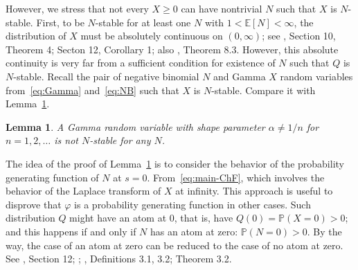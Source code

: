\documentclass[12pt]{amsart}
\newtheorem{lemma}{Lemma}[section]
\theoremstyle{remark}
\theoremstyle{definition}
\begin{document}
However, we stress that not every $X \ge 0$ can have nontrivial $N$ such that $X$ is $N$-stable. First, to be $N$-stable for at least one $N$ with $1 < \mathbb E[N] < \infty$, the distribution of $X$ must be absolutely continuous  on $(0, \infty)$; see \cite[Chapter I]{AthreyaBook}, Section 10, Theorem 4; Secton 12, Corollary 1; also \cite[Chapter 1]{Harris}, Theorem 8.3. However, this absolute continuity is very far from a sufficient condition for existence of $N$ such that $Q$ is $N$-stable. Recall the pair of negative binomial $N$ and Gamma $X$ random variables from~\eqref{eq:Gamma} and~\eqref{eq:NB} such that $X$ is $N$-stable. Compare it with Lemma~\ref{lemma:Gauss}.

\begin{lemma}
A Gamma random variable with shape parameter $\alpha \ne 1/n$ for $n = 1, 2, \ldots$ is not $N$-stable for any $N$. 
\label{lemma:Gauss}
\end{lemma}

The idea of the proof of Lemma~\ref{lemma:Gauss} is to consider the behavior of the probability generating function of $N$ at $s = 0$. From~\eqref{eq:main-ChF}, which involves the behavior of the Laplace transform of $X$ at infinity. This approach is useful to disprove that $\varphi$ is a probability generating function in other cases. Such distribution $Q$ might have an atom at $0$, that is, have $Q({0}) = \mathbb P(X = 0) > 0$; and this happens if and only if $N$ has an atom at zero: $\mathbb P(N = 0) > 0$. By the way, the case of an atom at zero can be reduced to the case of no atom at zero. See \cite[Chapter I]{AthreyaBook}, Section 12; \cite[Section 9]{B}; \cite[Section 3]{Harris1948}, Definitions 3.1, 3.2; Theorem 3.2. 
\end{document}

